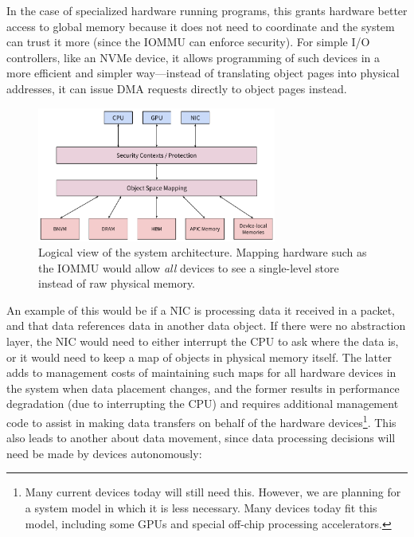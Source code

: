 {    

    In the case of specialized hardware running programs, this grants hardware better access to global
    memory because it does not need to coordinate and the system can trust it more (since the IOMMU can
    enforce security). For simple I/O controllers, like an NVMe device, it allows programming of such
    devices in a more efficient and simpler way---instead of translating object pages into physical
    addresses, it can issue DMA requests directly to object pages instead.


    \begin{figure}
        \centering
        \includegraphics[width=0.7\textwidth]{fig/log_sys_arch}
        \caption{Logical view of the system architecture. Mapping hardware such as the IOMMU would allow
            \emph{all} devices to see a single-level store instead of raw physical memory.}
        \label{fig:log_sys_arch}
    \end{figure}


    An example of this would be if a NIC is processing data it received in a packet, and that data
    references data in another data object. If there were no abstraction layer, the NIC would need to
    either interrupt the CPU to ask where the data is, or it would need to keep a map of objects in
    physical memory itself. The latter adds to management costs of maintaining such maps for all
    hardware devices in the system when data placement changes, and the former results in performance
    degradation (due to interrupting the CPU) and requires additional management code to assist in
    making data transfers on behalf of the hardware devices\footnote{Many current devices today will
        still need this. However, we are planning for a system model in which it is less necessary. Many
        devices today fit this model, including some GPUs and special off-chip processing
        accelerators.}. This also leads to another \observation about data movement, since data
    processing decisions will need be made by devices autonomously:

}
